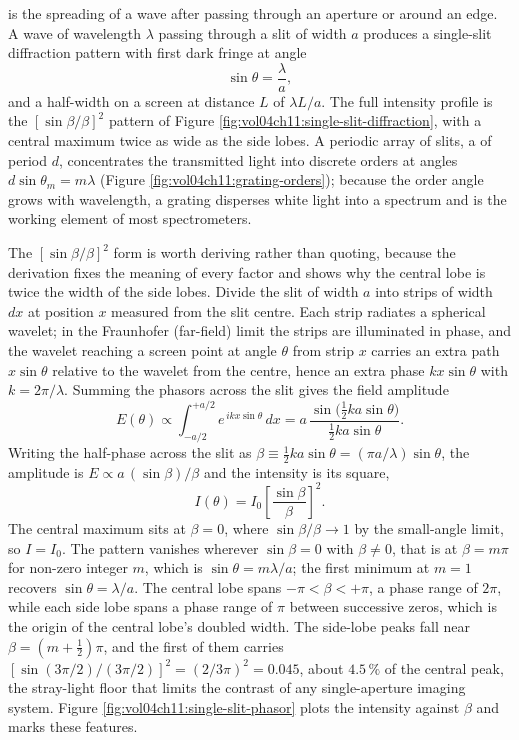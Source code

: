 

 is the spreading of a wave after passing
through an aperture or around an edge. A wave of wavelength $\lambda$
passing through a slit of width $a$ produces a single-slit
diffraction pattern with first dark fringe at angle
\[
\sin\theta = \frac{\lambda}{a},
\]
and a half-width on a screen at distance $L$ of $\lambda L/a$. The
full intensity profile is the $[\sin\beta/\beta]^{2}$ pattern of Figure
\ref{fig:vol04ch11:single-slit-diffraction}, with a central maximum
twice as wide as the side lobes. A periodic array of slits, a
 of period $d$, concentrates the
transmitted light into discrete orders at angles
$d\sin\theta_{m} = m\lambda$ (Figure \ref{fig:vol04ch11:grating-orders});
because the order angle grows with wavelength, a grating disperses white
light into a spectrum and is the working element of most spectrometers.



The $[\sin\beta/\beta]^{2}$ form is worth deriving rather than quoting,
because the derivation fixes the meaning of every factor and shows why
the central lobe is twice the width of the side lobes. Divide the slit of
width $a$ into strips of width $dx$ at position $x$ measured from the
slit centre. Each strip radiates a spherical wavelet; in the Fraunhofer
(far-field) limit the strips are illuminated in phase, and the wavelet
reaching a screen point at angle $\theta$ from strip $x$ carries an extra
path $x\sin\theta$ relative to the wavelet from the centre, hence an
extra phase $k x\sin\theta$ with $k = 2\pi/\lambda$. Summing the
phasors across the slit gives the field amplitude
\[
E(\theta) \propto \int_{-a/2}^{+a/2} e^{\,i k x\sin\theta}\,dx
= a\,\frac{\sin\!\big(\tfrac{1}{2}k a\sin\theta\big)}
{\tfrac{1}{2}k a\sin\theta}.
\]
Writing the half-phase across the slit as
$\beta \equiv \tfrac{1}{2}k a\sin\theta = (\pi a/\lambda)\sin\theta$, the
amplitude is $E \propto a\,(\sin\beta)/\beta$ and the intensity is its
square,
\[
I(\theta) = I_{0}\left[\frac{\sin\beta}{\beta}\right]^{2}.
\]
The central maximum sits at $\beta = 0$, where $\sin\beta/\beta \to 1$ by
the small-angle limit, so $I = I_{0}$. The pattern vanishes wherever
$\sin\beta = 0$ with $\beta \ne 0$, that is at $\beta = m\pi$ for
non-zero integer $m$, which is $\sin\theta = m\lambda/a$; the first
minimum at $m = 1$ recovers $\sin\theta = \lambda/a$. The central lobe
spans $-\pi < \beta < +\pi$, a phase range of $2\pi$, while each side lobe
spans a phase range of $\pi$ between successive zeros, which is the origin
of the central lobe's doubled width. The side-lobe peaks fall near
$\beta = (m + \tfrac{1}{2})\pi$, and the first of them carries
$[\sin(3\pi/2)/(3\pi/2)]^{2} = (2/3\pi)^{2} = 0.045$, about
$4.5\,\%$ of the central peak, the stray-light floor that limits the
contrast of any single-aperture imaging system. Figure
\ref{fig:vol04ch11:single-slit-phasor} plots the intensity against
$\beta$ and marks these features.

